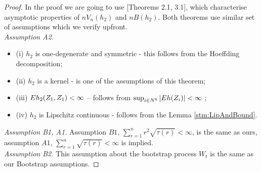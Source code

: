 \begin{proof}
In the proof we are going to use \cite{leucht_dependent_2013}[Theorems 2.1, 3.1], which characterise asymptotic properties of $nV_n(h_2)$ and $n B(h_2)$. Both  theorems use similar set of assumptions which we verify upfront.  \\
\textit{Assumption A2.}\begin{itemize}
 \item (i)  $h_2$ is one-degenerate and symmetric - this follows from the Hoeffding decomposition;
 \item (ii) $h_2$ is a kernel - is one of the assumptions of this theorem;
 \item (iii) $E h_2(Z_1,Z_1) < \infty$ -- follows from $\sup_{i \in N^6}|E h(Z_i) |<\infty$ ;
 \item  (iv) $h_2$ is Lipschitz continuous - follows from the Lemma \ref{stm:LipAndBound}.
\end{itemize}
\textit{Assumption B1, A1.} Assumption $B1$, $\sum_{r=1}^n r^2 \sqrt{\tau(r)} < \infty$, is the same as ours, assumption $A1$, $\sum_{r=1}^n  \sqrt{\tau(r)} < \infty$ is implied.\\
\textit{Assumption B2.} This assumption about the bootstrap process $W_t$ is the same as our Bootstrap assumptions. 



\end{proof}
